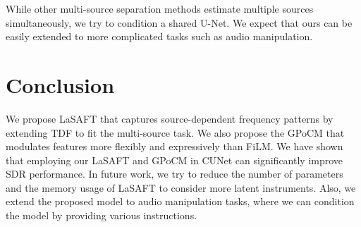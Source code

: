 \documentclass{article}
\begin{document}
While other multi-source separation methods \cite{dilatedlstm,d3net} estimate multiple sources simultaneously, we try to condition a shared U-Net. We expect that ours can be easily extended to more complicated tasks such as audio manipulation.


\label{sec:prior}


\section{Conclusion}
\label{sec:conclusion}

We propose LaSAFT that captures source-dependent frequency patterns by extending TDF to fit the multi-source task.
We also propose the GPoCM that modulates features more flexibly and expressively than FiLM.
We have shown that employing our LaSAFT and GPoCM in CUNet can significantly improve SDR performance.
In future work, we try to reduce the number of parameters and the memory usage of LaSAFT to consider more latent instruments.
Also, we extend the proposed model to audio manipulation tasks, where we can condition the model by providing various instructions.


\vfill\pagebreak





\end{document}
